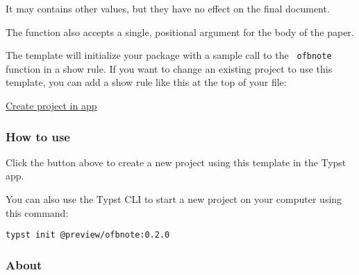 It may contains other values, but they have no effect on the final
document.

The function also accepts a single, positional argument for the body of
the paper.

The template will initialize your package with a sample call to the
\texttt{\ ofbnote\ } function in a show rule. If you want to change an
existing project to use this template, you can add a show rule like this
at the top of your file:

\begin{Shaded}
\begin{Highlighting}[]

\NormalTok{))}

\end{Highlighting}
\end{Shaded}

\href{/app?template=ofbnote&version=0.2.0}{Create project in app}

\subsubsection{How to use}\label{how-to-use}

Click the button above to create a new project using this template in
the Typst app.

You can also use the Typst CLI to start a new project on your computer
using this command:

\begin{verbatim}
typst init @preview/ofbnote:0.2.0
\end{verbatim}



\subsubsection{About}\label{about}

